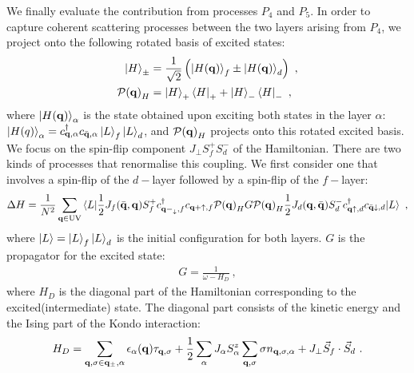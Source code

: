 \documentclass[%
reprint,
superscriptaddress,
groupedaddress,
superscriptaddress,
onecolumn,
10pt
]{revtex4-2}
\begin{document}
We finally evaluate the contribution from processes \(P_4\) and \(P_5\). In order to capture coherent scattering processes between the two layers arising from \(P_4\), we project onto the following rotated basis of excited states:
\begin{equation}\begin{aligned}
	\ket{H}_\pm &= \frac{1}{\sqrt{2}}\left(\ket{H({\bf q})}_f \pm \ket{H({\bf q})}_d\right)~,\\
	\mathcal{P({\bf q})}_H &= \ket{H}_+\bra{H}_+ + \ket{H}_-\bra{H}_-~,
\end{aligned}\end{equation}
where \(\ket{H({\bf q})}_\alpha\) is the state obtained upon exciting both states in the layer \(\alpha\): \(\ket{H(q)}_\alpha = c^\dagger_{{\bf q},\alpha}c_{\bar {\bf q},\alpha}\ket{L}_f\ket{L}_d\), and \(\mathcal{P({\bf q})}_H\) projects onto this rotated excited basis. We focus on the spin-flip component \(J_\perp S_f^+ S_d^-\) of the Hamiltonian. There are two kinds of processes that renormalise this coupling. We first consider one that involves a spin-flip of the \(d-\)layer followed by a spin-flip of the \(f-\)layer:
\begin{equation}\begin{aligned}\label{rgEqtn1}
	\Delta H = \frac{1}{N^2}\sum_{{\bf q} \in \text{UV}}\braket{L | \frac{1}{2}J_f(\bar{\bf q},{\bf q}) S_f^+ c^\dagger_{{\bf q-}_\downarrow,f}c_{{\bf q+}\uparrow,f} \mathcal{P({\bf q})}_H G \mathcal{P({\bf q})}_H\frac{1}{2}J_d({\bf q},\bar{\bf q})S_d^- c^\dagger_{{\bf q}\uparrow,d}c_{\bar {\bf q}\downarrow,d} | L }~,
\end{aligned}\end{equation}
where \(\ket{L} = \ket{L}_f \ket{L}_d\) is the initial configuration for both layers. \(G\) is the propagator for the excited state:
\begin{equation}\begin{aligned}
	G = \frac{1}{\omega - H_D}~,
\end{aligned}\end{equation}
where \(H_D\) is the diagonal part of the Hamiltonian corresponding to the excited(intermediate) state. The diagonal part consists of the kinetic energy and the Ising part of the Kondo interaction:
\begin{equation}\begin{aligned}
	H_D = \sum_{{\bf q,\sigma}\in{\bf q}_\pm, \alpha}\epsilon_\alpha({\bf q})\tau_{{\bf q},\sigma} + \frac{1}{2}\sum_\alpha J_\alpha S_\alpha^z \sum_{{\bf q},\sigma}\sigma n_{{\bf q},\sigma,\alpha} + J_\perp \vec{S}_f \cdot \vec{S}_d~.
\end{aligned}\end{equation}
\end{document}

